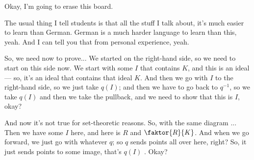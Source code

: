 \begin{proofWrapper}
\begin{content}[Bijective Property Part (A): \texorpdfstring{$q(q^{-1}(J)) = J$}{q(q^{-1}(J)) = J}]
\begin{center}
\end{center}
\end{content}

\begin{speech}[00:31:26 - 00:32:06]
 Okay, I'm going to erase this board.

The usual thing I tell students is that all the stuff I talk about, it's much easier to learn than German. German is a much harder language to learn than this, yeah. And I can tell you that from personal experience, yeah.
\end{speech}

\begin{speech}[00:32:06 - 00:34:06]
So, we need now to prove... We started on the right-hand side, so we need to start on this side now. We start with some $I$ that contains $K$, and this is an ideal  --- so, it's an ideal that contains that ideal $K$. And then we go with $I$ to the right-hand side, so we just take $q(I)$; and then we have to go back to $q^{-1}$, so we take $q(I)$ and then we take the pullback, and we need to show that this is $I$, okay? 

And now it's not true for set-theoretic reasons. So, with the same diagram ... Then we have some $I$ here, and here is $R$ and $\faktor{R}{K}$. And when we go forward, we just go with whatever $q$; so $q$ sends points all over here, right? So, it just sends points to some image, that's $q(I)$ . Okay?


\end{speech}
\end{proofWrapper}
